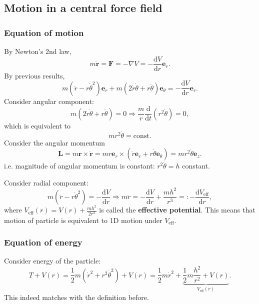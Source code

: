 \subsection{Motion in a central force field}
\subsubsection*{Equation of motion}
By Newton's 2nd law,
\[
    m \ddot{\mathbf{r}} = \mathbf{F} = - \nabla V = -\frac{\mathrm{d}V}{\mathrm{d}r}\mathbf{e}_r. 
\]
By previous results,
\[
    m\left( \ddot{r}-r\dot{\theta}^2 \right)\mathbf{e}_r+m\left( 2 \dot{r}\dot{\theta}+r \ddot{\theta} \right)\mathbf{e}_\theta=-\frac{\mathrm{d}V}{\mathrm{d}r}\mathbf{e}_r. 
\]
Consider angular component: 
\[
    m\left( 2 \dot{r}\dot{\theta}+r \ddot{\theta} \right) =0
    \Longrightarrow\frac{m}{r}\frac{\mathrm{d}}{\mathrm{d}t}\left( r^2\dot{\theta} \right)=0,
\]
which is equivalent to 
\[
    m r^2 \dot{\theta} = \text{const}.
\]
Consider the angular momentum 
\[
    \mathbf{L} = m\mathbf{r} \times \dot{\mathbf{r}} = mr\mathbf{e}_r \times (\dot{r}\mathbf{e}_r+r \dot{\theta}\mathbf{e}_\theta) =mr^2 \dot{\theta}\mathbf{e}_z.
\]
i.e. magnitude of angular momentum is constant: $ r^2 \dot{\theta}=h $ constant.

Consider radial component: 
\begin{equation}\label{eq:radial component}\tag{$*$}
    m\left( \ddot{r}-r\dot{\theta}^2 \right) = -\frac{\mathrm{d}V}{\mathrm{d}r} \Longrightarrow m \ddot{r}=-\frac{\mathrm{d}V}{\mathrm{d}r}+\frac{mh^2}{r^3}=: -\frac{\mathrm{d}V_{\text{eff}}}{\mathrm{d}r},  
\end{equation}
where $ V_{\text{eff}}(r)=V(r)+\frac{mh^2}{2r^2} $ is called the \textbf{effective potential}. This means that motion of particle is equivalent to 1D motion under $ V_{\text{eff}} $.
\subsubsection*{Equation of energy}
Consider energy of the particle:
\[
    T+V(r) = \frac{1}{2}m \left( \dot{r}^2+r^2 \dot{\theta}^2 \right) +V(r) = \frac{1}{2}m \dot{r}^2+\underbrace{\frac{1}{2}m\frac{h^2}{r^2}+V(r)}_{V_{\text{eff}}(r)}.
\]
This indeed matches with the definition before.

